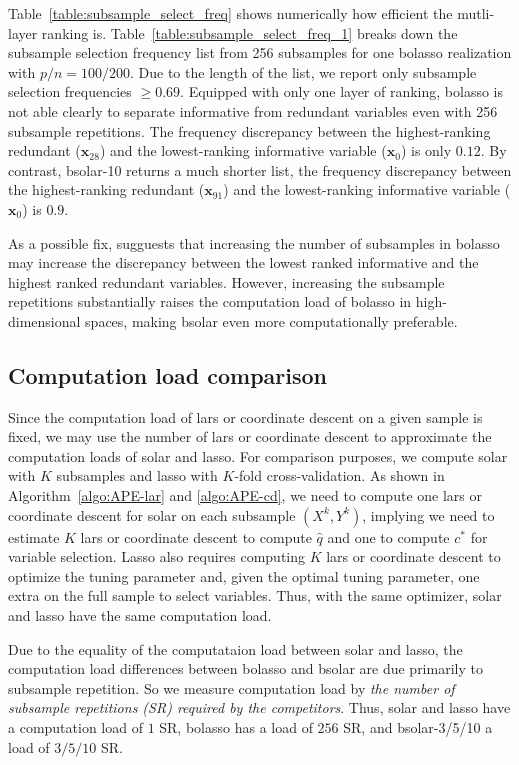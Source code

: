 \documentclass[11pt,authoryear]{elsarticle}
\begin{document}
Table~\ref{table:subsample_select_freq} shows numerically how efficient the mutli-layer ranking is. Table~\ref{table:subsample_select_freq_1} breaks down the subsample selection frequency list from 256 subsamples for one bolasso realization with $p/n=100/200$. Due to the length of the list, we report only subsample selection frequencies $\ge0.69$. Equipped with only one layer of ranking, bolasso is not able clearly to separate informative from redundant variables even with 256 subsample repetitions. The frequency discrepancy between the highest-ranking redundant ($\mathbf{x}_{28}$) and the lowest-ranking informative variable ($\mathbf{x}_0$) is only $0.12$. By contrast, bsolar-10 returns a much shorter list, the frequency discrepancy between the highest-ranking redundant ($\mathbf{x}_{91}$) and the lowest-ranking informative variable ($\mathbf{x}_0$) is $0.9$.

As a possible fix, \citet{bach2008bolasso} sugguests that increasing the number of subsamples in bolasso may increase the discrepancy between the lowest ranked informative and the highest ranked redundant variables. However, increasing the subsample repetitions substantially raises the computation load of bolasso in high-dimensional spaces, making bsolar even more computationally preferable.

\subsection{Computation load comparison \label{subsection:comp}}

Since the computation load of lars or coordinate descent on a given sample is fixed, we may use the number of lars or coordinate descent to approximate the computation loads of solar and lasso. For comparison purposes, we compute solar with $K$ subsamples and lasso with $K$-fold cross-validation. As shown in Algorithm~\ref{algo:APE-lar} and \ref{algo:APE-cd}, we need to compute one lars or coordinate descent for solar on each subsample $(X^k, Y^k)$, implying we need to estimate $K$ lars or coordinate descent to compute $\widehat{q}$ and one to compute $c^*$ for variable selection. Lasso also requires computing $K$ lars or coordinate descent to optimize the tuning parameter and, given the optimal tuning parameter, one extra on the full sample to select variables. Thus, with the same optimizer, solar and lasso have the same computation load.

Due to the equality of the computataion load between solar and lasso, the computation load differences between bolasso and bsolar are due primarily to subsample repetition. So we measure computation load by \emph{the number of subsample repetitions (SR) required by the competitors}. Thus, solar and lasso have a computation load of $1$ SR, bolasso has a load of $256$ SR, and bsolar-3/5/10 a load of $3/5/10$ SR.
\end{document}
